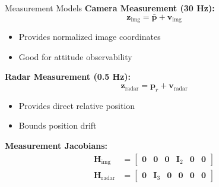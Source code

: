 \documentclass{beamer}
\newcommand{\pr}{\mathbf{p}_r}
\newcommand{\pbar}{\bar{\mathbf{p}}}
\newcommand{\I}{\mathbf{I}}
\begin{document}
\begin{frame}{Measurement Models}
\textbf{Camera Measurement (30 Hz):}
\begin{equation*}
    \mathbf{z}_{\text{img}} = \pbar + \mathbf{v}_{\text{img}}
\end{equation*}
\begin{itemize}
    \item Provides normalized image coordinates
    \item Good for attitude observability
\end{itemize}

\vspace{0.1cm}
\textbf{Radar Measurement (0.5 Hz):}
\begin{equation*}
    \mathbf{z}_{\text{radar}} = \pr + \mathbf{v}_{\text{radar}}
\end{equation*}
\begin{itemize}
    \item Provides direct relative position
    \item Bounds position drift
\end{itemize}

\vspace{0.1cm}
\textbf{Measurement Jacobians:}
\begin{align*}
    \mathbf{H}_{\text{img}} &= \begin{bmatrix} \mathbf{0} & \mathbf{0} & \mathbf{0} & \I_2 & \mathbf{0} & \mathbf{0} \end{bmatrix} \\
    \mathbf{H}_{\text{radar}} &= \begin{bmatrix} \mathbf{0} & \I_3 & \mathbf{0} & \mathbf{0} & \mathbf{0} & \mathbf{0} \end{bmatrix}
\end{align*}
\end{frame}
\end{document}
